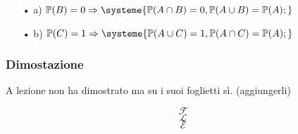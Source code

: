 \begin{itemize}
\item[•] a) $\mathbb{P}(B) = 0 \Rightarrow \systeme{\mathbb{P}(A \cap B) = 0, \mathbb{P}(A \cup B) = \mathbb{P}(A);} $
\item[•] b) $ \mathbb{P}(C) = 1 \Rightarrow \systeme{\mathbb{P}(A \cup C) = 1,  \mathbb{P}(A \cap C) = \mathbb{P}(A);} $
\end{itemize}

\subsubsection{Dimostazione}
A lezione non ha dimostrato ma su i suoi foglietti sì. (aggiungerli)

$$ \mathscr{F} $$
$$ \mathscr{L} $$
$$ \mathscr{E} $$













